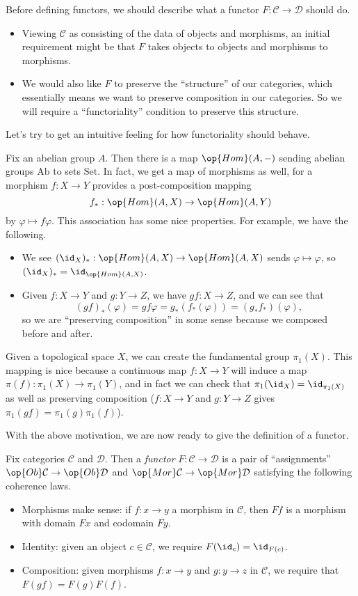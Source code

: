 \documentclass[../notes.tex]{subfiles}
\begin{document}
Before defining functors, we should describe what a functor $F:\mathcal C\to\mathcal D$ should do.
\begin{itemize}
	\item Viewing $\mathcal C$ as consisting of the data of objects and morphisms, an initial requirement might be that $F$ takes objects to objects and morphisms to morphisms.
	\item We would also like $F$ to preserve the ``structure'' of our categories, which essentially means we want to preserve composition in our categories. So we will require a ``functoriality'' condition to preserve this structure.
\end{itemize}
Let's try to get an intuitive feeling for how functoriality should behave.
\begin{example}
	Fix an abelian group $A$. Then there is a map $\op{Hom}(A,-)$ sending abelian groups $\mathrm{Ab}$ to sets $\mathrm{Set}$. In fact, we get a map of morphisms as well, for a morphism $f:X\to Y$ provides a post-composition mapping
	\[f_*:\op{Hom}(A,X)\to\op{Hom}(A,Y)\]
	by $\varphi\mapsto f\varphi$. This association has some nice properties. For example, we have the following.
	\begin{itemize}
		\item We see $(\id_X)_*:\op{Hom}(A,X)\to\op{Hom}(A,X)$ sends $\varphi\mapsto\varphi$, so $(\id_X)_*=\id_{\op{Hom}(A,X)}$.
		\item Given $f:X\to Y$ and $g:Y\to Z$, we have $gf:X\to Z$, and we can see that
		\[(gf)_*(\varphi)=gf\varphi=g_*(f_*(\varphi))=(g_*f_*)(\varphi),\]
		so we are ``preserving composition'' in some sense because we composed before and after.
	\end{itemize}
\end{example}
\begin{example}
	Given a topological space $X$, we can create the fundamental group $\pi_1(X)$. This mapping is nice because a continuous map $f:X\to Y$ will induce a map $\pi(f):\pi_1(X)\to\pi_1(Y)$, and in fact we can check that $\pi_1(\id_X)=\id_{\pi_1(X)}$ as well as preserving composition ($f:X\to Y$ and $g:Y\to Z$ gives $\pi_1(gf)=\pi_1(g)\pi_1(f)$).
\end{example}

With the above motivation, we are now ready to give the definition of a functor.
\begin{definition}[Functor]
	Fix categories $\mathcal C$ and $\mathcal D$. Then a \textit{functor} $F:\mathcal C\to\mathcal D$ is a pair of ``assignments'' $\op{Ob}\mathcal C\to\op{Ob}\mathcal D$ and $\op{Mor}\mathcal C\to\op{Mor}\mathcal D$ satisfying the following coherence laws.
	\begin{itemize}
		\item Morphisms make sense: if $f:x\to y$ a morphism in $\mathcal C$, then $Ff$ is a morphism with domain $Fx$ and codomain $Fy$.
		\item Identity: given an object $c\in\mathcal C$, we require $F(\id_c)=\id_{F(c)}$.
		\item Composition: given morphisms $f:x\to y$ and $g:y\to z$ in $\mathcal C$, we require that $F(gf)=F(g)F(f)$.
	\end{itemize}
\end{definition}
\end{document}

